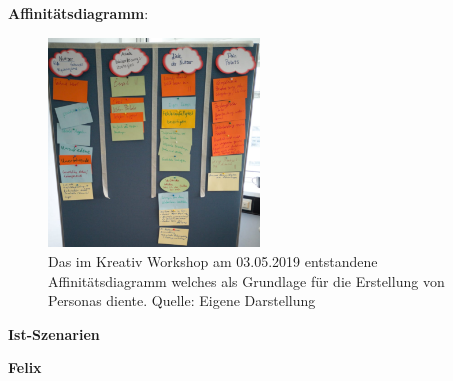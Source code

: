 \appendix
\chapter{}
\label{anhangA}

\textbf{Affinitätsdiagramm}:

\begin{figure}[H]
	\centering
	\includegraphics[width=0.50\textwidth]{resources/anhang/Affinitaetsdiagramm.png}
	\caption{Das im Kreativ Workshop am 03.05.2019 entstandene Affinitätsdiagramm welches als Grundlage für die Erstellung von Personas diente. Quelle: Eigene Darstellung}
	\label{img:affinitydiagramm}
\end{figure}




\textbf{Ist-Szenarien}

\textbf{Felix}

